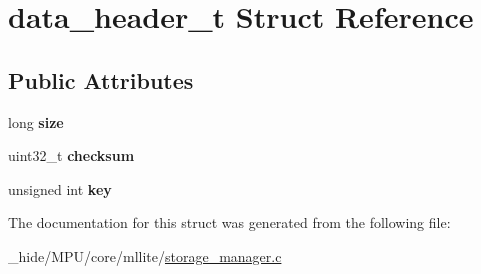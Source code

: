 \hypertarget{structdata__header__t}{}\section{data\+\_\+header\+\_\+t Struct Reference}
\label{structdata__header__t}
\subsection*{Public Attributes}
\begin{DoxyCompactItemize}
\item 
\hypertarget{structdata__header__t_a67d0a4569a4158682da05f2605b310e8}{}long {\bfseries size}\label{structdata__header__t_a67d0a4569a4158682da05f2605b310e8}

\item 
\hypertarget{structdata__header__t_ad1c4e02bf299793b3749568aa3e2cb51}{}uint32\+\_\+t {\bfseries checksum}\label{structdata__header__t_ad1c4e02bf299793b3749568aa3e2cb51}

\item 
\hypertarget{structdata__header__t_aa61838f7b6f41eb8066534a6748ad9e5}{}unsigned int {\bfseries key}\label{structdata__header__t_aa61838f7b6f41eb8066534a6748ad9e5}

\end{DoxyCompactItemize}


The documentation for this struct was generated from the following file\+:\begin{DoxyCompactItemize}
\item 
\+\_\+hide/\+M\+P\+U/core/mllite/\hyperlink{storage__manager_8c}{storage\+\_\+manager.\+c}\end{DoxyCompactItemize}

